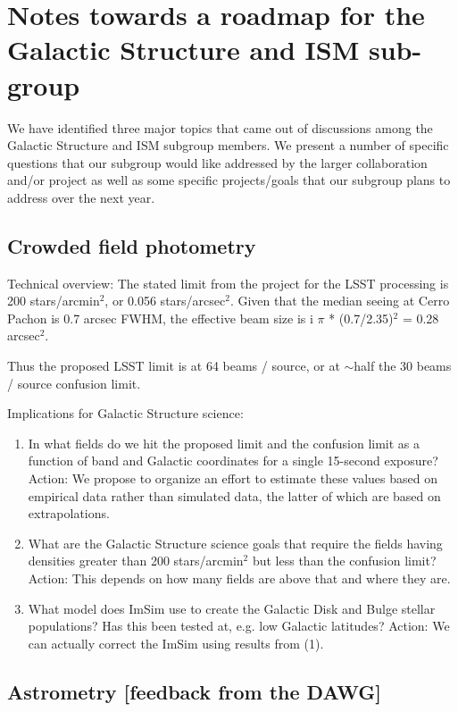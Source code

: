 
\section{Notes towards a roadmap for the Galactic Structure and ISM sub-group}

We have identified three major topics that came out of discussions among the Galactic Structure and ISM subgroup members. We present a number of specific questions that our subgroup would like addressed by the larger collaboration and/or project as well as some specific projects/goals that our subgroup plans to address over the next year. 

\subsection{Crowded field photometry}

Technical overview: The stated limit from the project for the LSST processing is 200 stars/arcmin$^2$,
or 0.056 stars/arcsec$^2$. 
Given that the median seeing at Cerro Pachon is 0.7 arcsec FWHM, the effective beam size is i
$\pi$ * (0.7/2.35)$^2$ = 0.28 arcsec$^2$. 

Thus the proposed LSST limit is at 64 beams / source, or at $\sim$half the 30 beams / source confusion limit.
 
Implications for Galactic Structure science: 
\begin{enumerate}
\item In what fields do we hit the proposed limit and the confusion limit as a function of band and Galactic coordinates for a single 15-second exposure? Action: We propose to organize an effort to estimate these values based on empirical data rather than simulated data, the latter of which are based on extrapolations. 
\item What are the Galactic Structure science goals that require the fields having densities greater than
 200 stars/arcmin$^2$ but less than the confusion limit? Action: This depends on how many fields are above that and where they are. 
\item What model does ImSim use to create the Galactic Disk and Bulge stellar populations? Has this been tested at, e.g. low Galactic latitudes? Action: We can actually correct the ImSim using results from (1). 
\end{enumerate}

\subsection{Astrometry [feedback from the DAWG]}

